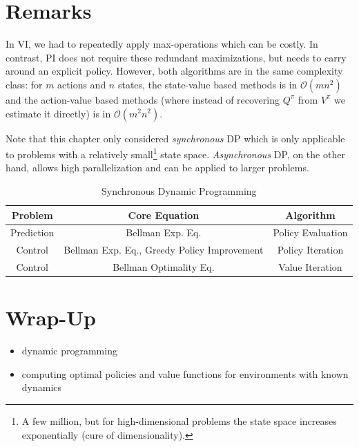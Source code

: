 	\section{Remarks}
		In \ac{VI}, we had to repeatedly apply max-operations which can be costly. In contrast, \ac{PI} does not require these redundant maximizations, but needs to carry around an explicit policy. However, both algorithms are in the same complexity class: for \(m\) actions and \(n\) states, the state-value based methods is in \( \mathcal{O}(m n^2) \) and the action-value based methods (where instead of recovering \(Q^\pi\) from \(V^\pi\) we estimate it directly) is in \( \mathcal{O}(m^2 n^2) \).

		Note that this chapter only considered \emph{synchronous} \ac{DP} which is only applicable to problems with a relatively small\footnote{A few million, but for high-dimensional problems the state space increases exponentially (cure of dimensionality).} state space. \emph{Asynchronous} \ac{DP}, on the other hand, allows high parallelization and can be applied to larger problems.

		\begin{table}
			\centering
			\begin{tabular}{ccc}
				\toprule
				\textbf{Problem} &           \textbf{Core Equation}            & \textbf{Algorithm} \\ \midrule
				   Prediction    &              Bellman Exp. Eq.               & Policy Evaluation  \\
				    Control      & Bellman Exp. Eq., Greedy Policy Improvement &  Policy Iteration  \\
				    Control      &           Bellman Optimality Eq.            &  Value Iteration   \\ \bottomrule
			\end{tabular}
			\caption{Synchronous Dynamic Programming}
			\label{fig:syncDp}
		\end{table}

	\section{Wrap-Up}
		\begin{itemize}
			\item dynamic programming
			\item computing optimal policies and value functions for environments with known dynamics
		\end{itemize}

